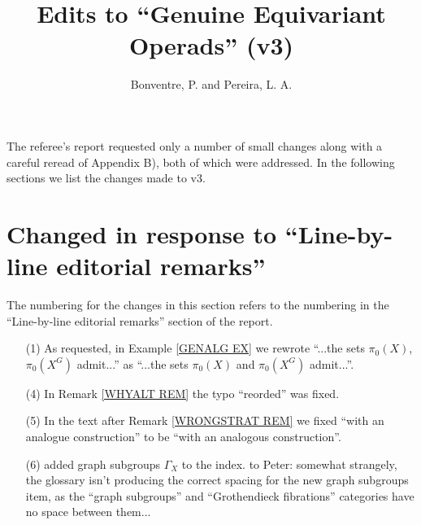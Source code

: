 \documentclass{article}
\begin{document}
 
 
\title{Edits to ``Genuine Equivariant Operads'' (v3)
\\[12pt]} %
 
\author{Bonventre, P. and Pereira, L. A.}
 
\maketitle

The referee's report requested only a number of small changes along with a careful reread of Appendix B),
both of which were addressed. In the following sections we list the changes made to v3.


\section{Changed in response to ``Line-by-line editorial remarks''}

The numbering for the changes in this section refers to the numbering in the ``Line-by-line editorial remarks'' section of the report.

\begin{itemize}

\item[(1)] As requested, in Example \ref{GENALG EX} we rewrote ``...the sets $\pi_0(X)$, $\pi_0(X^G)$ admit...'' as ``...the sets $\pi_0(X)$ and $\pi_0(X^G)$ admit...''.



\item[(4)] In Remark \ref{WHYALT REM} the typo ``reorded'' was fixed.

\item[(5)]
In the text after Remark \ref{WRONGSTRAT REM} we fixed
``with an analogue construction'' to be 
``with an analogous construction''.

\item[(6)] added graph subgroups $\Gamma_X$ to the index. {\color{red} to Peter: somewhat strangely, the glossary isn't producing the correct spacing for the new graph subgroups item, as the ``graph subgroups'' and ``Grothendieck fibrations'' categories have no space between them...}

\end{itemize}









{}


\end{document}
